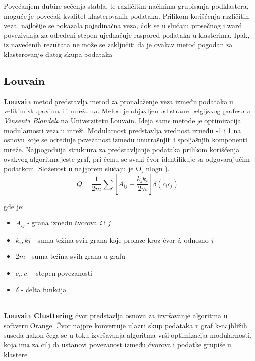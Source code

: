 \documentclass[a4paper]{article}
\begin{document}
Povećanjem dubine sečenja stabla, te različitim načinima grupisanja podklastera, moguće je povećati kvalitet klasterovanih podataka. Prilikom korišćenja različitih veza, najlošije se pokazala pojedinačna veza, dok se u slučaju prosečnog i ward povezivanja za određeni stepen ujednačuje raspored podataka u klasterima. Ipak, iz navedenih rezultata ne može se zaključiti da je ovakav metod pogodan za klasterovanje datog skupa podataka.



\subsection{Louvain}
\textbf{Louvain} metod predstavlja metod za pronalaženje veza između podataka u velikim skupovima ili mrežama. Metod je objavljen od strane belgijskog profesora \textit{Vinsenta Blondela} na Univerzitetu Louvain.
Ideja same metode je optimizacija modularnosti veza u mreži. Modularnost predstavlja vrednost između -1 i 1 na osnovu koje se određuje povezanost između unutrašnjih i spoljašnjih komponenti mreže. Najpogodnija struktura za predstavljanje podataka prilikom korišćenja ovakvog algoritma jeste graf, pri čemu se svaki čvor identifikuje sa odgovarajućim podatkom. Složenost u najgorem slučaju je O\left ( nlogn \right ).
\\

$$ Q = \frac{1}{2m}\sum \left [ A_{ij}-\frac{k_{j}k_{i}}{2m} \right ]\delta (c_{i}c_{j}) $$

gde je:

\begin{itemize}
    \item $A_{ij}$ - grana između čvorova \textit{i} i \textit{j}
    \item $k_{i}, k{j}$ - suma težina svih grana koje prolaze kroz čvor \textit{i}, odnosno \textit{j}
    \item $2m$ - suma težina svih grana u grafu
    \item $c_{i}, c_{j}$ - stepen povezanosti
    \item $\delta$ - delta funkcija
\end{itemize}


\\

\textbf{Louvain Clusttering} čvor predstavlja osnovu za izvršavanje algoritma u softveru Orange.
Čvor najpre konvertuje ulazni skup podataka u graf k-najbližih suseda nakon čega se u toku izvršavanja algoritma vrši optimizacija modularnosti, koja ima za cilj da ustanovi povezanost između čvorova i podatke grupiše u klastere. \\
\end{document}
